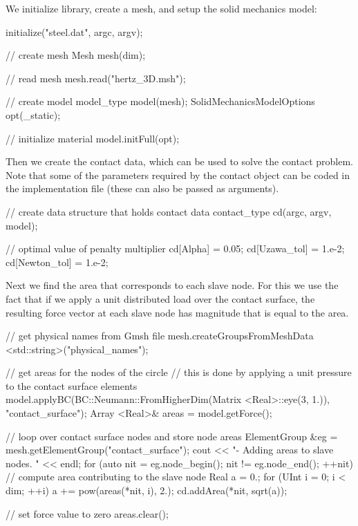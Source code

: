 We initialize library, create a mesh, and setup the solid mechanics model:

\begin{cpp}

  initialize("steel.dat", argc, argv);

  // create mesh
  Mesh mesh(dim);

  // read mesh
  mesh.read("hertz_3D.msh");

  // create model
  model_type model(mesh);
  SolidMechanicsModelOptions opt(_static);

  // initialize material
  model.initFull(opt);
\end{cpp}


Then we create the contact data, which can be used to solve the contact problem. Note that some of the parameters required by the contact object can be coded in the implementation file (these can also be passed as arguments).
\begin{cpp}

  // create data structure that holds contact data
  contact_type cd(argc, argv, model);

  // optimal value of penalty multiplier
  cd[Alpha] = 0.05;
  cd[Uzawa_tol] = 1.e-2;
  cd[Newton_tol] = 1.e-2;
\end{cpp}


Next we find the area that corresponds to each slave node. For this we use the fact that if we apply a unit distributed load over the contact surface, the resulting force vector at each slave node has magnitude that is equal to the area.
\begin{cpp}

  // get physical names from Gmsh file
  mesh.createGroupsFromMeshData <std::string>("physical_names");

  // get areas for the nodes of the circle
  // this is done by applying a unit pressure to the contact surface elements
  model.applyBC(BC::Neumann::FromHigherDim(Matrix <Real>::eye(3, 1.)), "contact_surface");
  Array <Real>& areas = model.getForce();

  // loop over contact surface nodes and store node areas
  ElementGroup &eg = mesh.getElementGroup("contact_surface");
  cout << "- Adding areas to slave nodes. " << endl;
  for (auto nit = eg.node_begin(); nit != eg.node_end(); ++nit) {
    // compute area contributing to the slave node
    Real a = 0.;
    for (UInt i = 0; i < dim; ++i)
      a += pow(areas(*nit, i), 2.);
    cd.addArea(*nit, sqrt(a));
  }

  // set force value to zero
  areas.clear();
\end{cpp}

